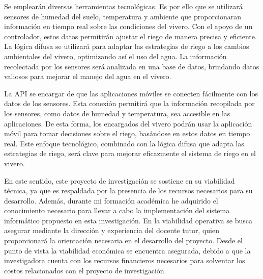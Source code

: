 \bigbreak
Se emplearán diversas herramientas tecnológicas. Es por ello que se utilizará sensores de humedad del suelo, temperatura y ambiente que proporcionaran información en tiempo real sobre las condiciones del vivero. Con el apoyo de un controlador, estos datos permitirán ajustar el riego de manera precisa y eficiente. La lógica difusa se utilizará para adaptar las estrategias de riego a los cambios ambientales del vivero, optimizando así el uso del agua. La información recolectada por los sensores será analizada en una base de datos, brindando datos valiosos para mejorar el manejo del agua en el vivero. 

\bigbreak 
La API se encargar de que las aplicaciones móviles se conecten fácilmente con los datos de los sensores. Esta conexión permitirá que la información recopilada por los sensores, como datos de humedad y temperatura, sea accesible en las aplicaciones. De esta forma, los encargados del vivero podrán usar la aplicación móvil para tomar decisiones sobre el riego, basándose en estos datos en tiempo real. Este enfoque tecnológico, combinado con la lógica difusa que adapta las estrategias de riego, será clave para mejorar eficazmente el sistema de riego en el vivero.

\bigbreak 
En este sentido, este proyecto de investigación se sostiene en su viabilidad técnica, ya que es respaldada por la presencia de los recursos necesarios para su desarrollo. Además, durante mi formación académica he adquirido el conocimiento necesario para llevar a cabo la implementación del sistema informático propuesto en esta investigación. En la viabilidad operativa se busca asegurar mediante la dirección y experiencia del docente tutor, quien proporcionará la orientación necesaria en el desarrollo del proyecto. Desde el punto de vista la viabilidad económica se encuentra asegurada, debido a que la investigadora cuenta con los recursos financieros necesarios para solventar los costos relacionados con el proyecto de investigación.

